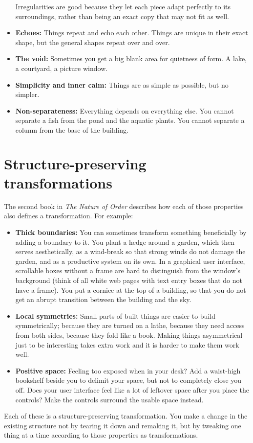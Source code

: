 \begin{itemize}
Irregularities are good because they let each piece adapt perfectly to its
surroundings, rather than being an exact copy that may not fit as well.
 \item \textbf{Echoes:} Things repeat and echo each other. Things are unique in
their exact shape, but the general shapes repeat over and over.
 \item \textbf{The void:} Sometimes you get a big blank area for quietness of
form. A lake, a courtyard, a picture window.
 \item \textbf{Simplicity and inner calm:} Things are as simple as possible, but
no simpler.
 \item \textbf{Non-separateness:} Everything depends on everything else. You cannot separate a fish from the pond and the aquatic plants. You cannot separate a
column from the base of the building.
\end{itemize}

\section*{Structure-preserving transformations}

The second book in \textit{The Nature of Order} describes how each of those
properties also defines a transformation. For example:
\begin{itemize}
 \item \textbf{Thick boundaries:} You can sometimes transform something
beneficially by adding a boundary to it. You plant a hedge around a garden,
which then serves aesthetically, as a wind-break so that strong winds do not damage
the garden, and as a productive system on its own. In a graphical user
interface, scrollable boxes without a frame are hard to distinguish from the
window's background (think of all white web pages with text entry boxes that do
not have a frame). You put a cornice at the top of a building, so that you do
not get an abrupt transition between the building and the sky.
 \item \textbf{Local symmetries:} Small parts of built things are easier to
build symmetrically; because they are turned on a lathe, because they need
access from both sides, because they fold like a book. Making things
asymmetrical just to be interesting takes extra work and it is harder to make
them work well.
 \item \textbf{Positive space:} Feeling too exposed when in your desk?  Add a
waist-high bookshelf beside you to delimit your space, but not to completely
close you off. Does your user interface feel like a lot of leftover space after
you place the controls?  Make the controls surround the usable space instead.
\end{itemize}
Each of these is a structure-preserving transformation. You make a change in the
existing structure not by tearing it down and remaking it, but by tweaking one
thing at a time according to those properties as transformations.

